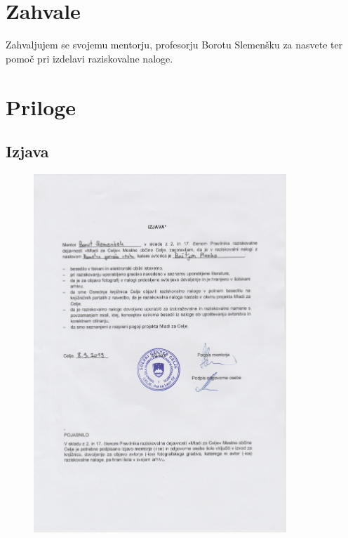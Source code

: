 \documentclass[11pt]{article}
\begin{document}
\begin{flushleft}


\end{flushleft}
\newpage
\section{Zahvale}
Zahvaljujem se svojemu mentorju, profesorju Borotu Slemenšku za nasvete ter pomoč pri izdelavi raziskovalne naloge.
\newpage
\section{Priloge}
\subsection{Izjava}
\begin{figure}[h]
\centering
\includegraphics[width=0.85\textwidth]{images/izjava.jpg}
\end{figure}
\newpage
\end{document}
